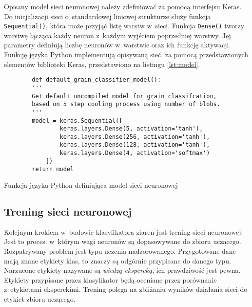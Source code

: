 Opisany model sieci neuronowej należy zdefiniować za pomocą interfejsu
Keras.
Do inicjalizacji sieci o~standardowej liniowej strukturze służy funkcja
\texttt{Sequential()}, która może przyjąć listę warstw w~sieci.
Funkcja \texttt{Dense()} tworzy warstwę łącząca każdy neuron
z~każdym wyjściem poprzedniej warstwy.
Jej parametry definiują liczbę neuronów w~warstwie oraz ich funkcję aktywacji.
Funkcję języka Python implementują opisywaną sieć, za pomocą przedstawionych
elementów biblioteki Keras, przedstawiono na listingu \ref{lst:model}.
\begin{listing}[htb]
	\begin{verbatim}
		def default_grain_classifier_model():
		'''
		Get default uncompiled model for grain classifcation,
		based on 5 step cooling process using number of blobs.
		'''
		model = keras.Sequential([
				keras.layers.Dense(5, activation='tanh'),
				keras.layers.Dense(256, activation='tanh'),
				keras.layers.Dense(128, activation='tanh'),
				keras.layers.Dense(4, activation='softmax')
			])
		return model
	\end{verbatim}
	\caption{Funkcja języka Python definiująca model sieci neuronowej}
	\label{lst:model}
\end{listing}

\subsection{Trening sieci neuronowej}
\label{subsec:nn_train}
Kolejnym krokiem w~budowie klasyfikatora ziaren jest trening sieci neuronowej.
Jest to proces. w~którym wagi neuronów są dopasowywane do zbioru uczącego.
Rozpatrywany problem jest typu uczenia nadzorowanego.
Przygotowane dane mają znane etykiety klas, to znaczy są odgórnie przypisane
do danego typu.
Narzucone etykiety nazywane są \emph{wiedzą ekspercką}, ich prawdziwość jest
pewna.
Etykiety przypisane przez klasyfikator będą oceniane przez porównanie
z~etykietami eksperckimi.
Trening polega na zbliżaniu wyników działania sieci do etykiet zbioru
uczącego.


